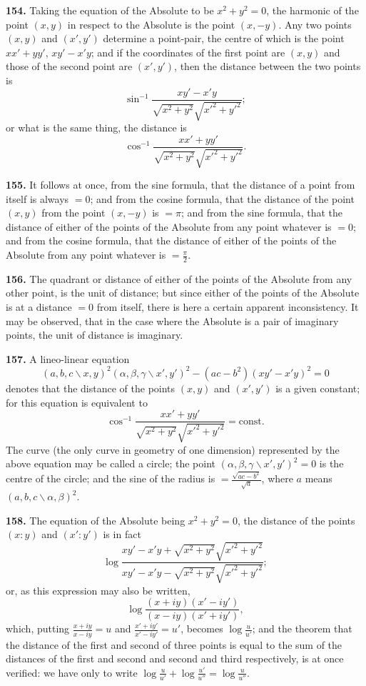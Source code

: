 \documentclass[11pt,a4paper]{article}
\begin{document}
\textbf{154.} Taking the equation of the Absolute to be $x^2+y^2=0$, the harmonic of
the point $(x,y)$ in respect to the Absolute is the point $(x,-y)$. Any two points
$(x,y)$ and $(x',y')$ determine a point-pair, the centre of which is the point
$xx'+yy'$, $xy'-x'y$; and if the coordinates of the first point are $(x,y)$ and those of the
second point are $(x',y')$, then the distance between the two points is
\[
\sin^{-1}\frac{xy'-x'y}{\sqrt{x^2+y^2}\sqrt{x'^2+y'^2}};
\]
or what is the same thing, the distance is
\[
\cos^{-1}\frac{xx'+yy'}{\sqrt{x^2+y^2}\sqrt{x'^2+y'^2}}.
\]

\textbf{155.} It follows at once, from the sine formula, that the distance of a point
from itself is always $=0$; and from the cosine formula, that the distance of the point
$(x,y)$ from the point $(x,-y)$ is $=\pi$; and from the sine formula, that the distance
of either of the points of the Absolute from any point whatever is $=0$; and from the
cosine formula, that the distance of either of the points of the Absolute from any point
whatever is $=\frac{\pi}{2}$.

\textbf{156.} The quadrant or distance of either of the points of the Absolute from any
other point, is the unit of distance; but since either of the points of the Absolute is at
a distance $=0$ from itself, there is here a certain apparent inconsistency. It may be
observed, that in the case where the Absolute is a pair of imaginary points, the unit of
distance is imaginary.

\textbf{157.} A lineo-linear equation
\[
(a,b,c\!\backslash x,y)^2(\alpha,\beta,\gamma\!\backslash x',y')^2-(ac-b^2)(xy'-x'y)^2=0
\]
denotes that the distance of the points $(x,y)$ and $(x',y')$ is a given constant; for this
equation is equivalent to
\[
\cos^{-1}\frac{xx'+yy'}{\sqrt{x^2+y^2}\sqrt{x'^2+y'^2}}=\text{const.}
\]
The curve (the only curve in geometry of one dimension) represented by the above
equation may be called a circle; the point $(\alpha,\beta,\gamma\!\backslash x',y')^2=0$ is the centre of the circle;
and the sine of the radius is $=\frac{\sqrt{ac-b^2}}{\sqrt{a}}$, where $a$ means $(a,b,c\!\backslash \alpha,\beta)^2$.

\textbf{158.} The equation of the Absolute being $x^2+y^2=0$, the distance of the points
$(x:y)$ and $(x':y')$ is in fact
\[
\log\frac{xy'-x'y+\sqrt{x^2+y^2}\sqrt{x'^2+y'^2}}{xy'-x'y-\sqrt{x^2+y^2}\sqrt{x'^2+y'^2}};
\]
or, as this expression may also be written,
\[
\log\frac{(x+iy)(x'-iy')}{(x-iy)(x'+iy')},
\]
which, putting $\frac{x+iy}{x-iy}=u$ and $\frac{x'+iy'}{x'-iy'}=u'$, becomes $\log\frac{u}{u'}$; and the theorem that
the distance of the first and second of three points is equal to the sum of the distances
of the first and second and second and third respectively, is at once verified: we have
only to write $\log\frac{u}{u'} + \log\frac{u'}{u''} = \log\frac{u}{u''}$.
\end{document}
